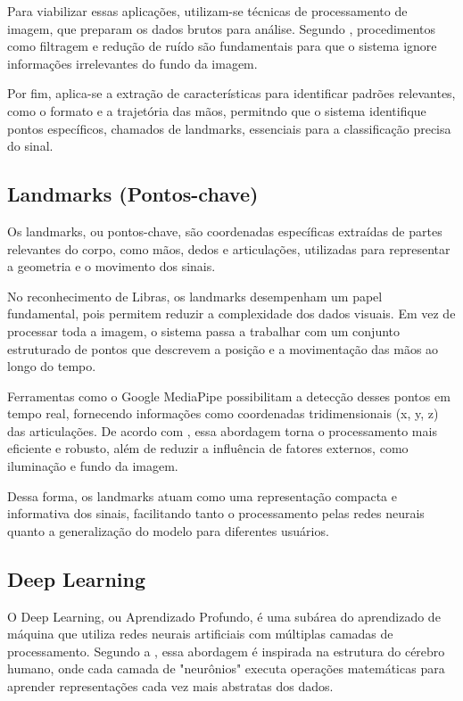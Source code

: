 \documentclass[
    12pt,                %
    openright,           %
    oneside,             %
    a4paper,             %
    english,             %
    brazil               %
]{abntex2}
\begin{document}
Para viabilizar essas aplicações, utilizam-se técnicas de processamento de imagem, que preparam os dados brutos para análise. Segundo , procedimentos como filtragem e redução de ruído são fundamentais para que o sistema ignore informações irrelevantes do fundo da imagem.

Por fim, aplica-se a extração de características para identificar padrões relevantes, como o formato e a trajetória das mãos, permitndo que o sistema identifique pontos específicos, chamados de landmarks, essenciais para a classificação precisa do sinal.


\subsection{Landmarks (Pontos-chave)}

Os landmarks, ou pontos-chave, são coordenadas específicas extraídas de partes relevantes do corpo, como mãos, dedos e articulações, utilizadas para representar a geometria e o movimento dos sinais.

No reconhecimento de Libras, os landmarks desempenham um papel fundamental, pois permitem reduzir a complexidade dos dados visuais. Em vez de processar toda a imagem, o sistema passa a trabalhar com um conjunto estruturado de pontos que descrevem a posição e a movimentação das mãos ao longo do tempo.

Ferramentas como o Google MediaPipe possibilitam a detecção desses pontos em tempo real, fornecendo informações como coordenadas tridimensionais (x, y, z) das articulações. De acordo com , essa abordagem torna o processamento mais eficiente e robusto, além de reduzir a influência de fatores externos, como iluminação e fundo da imagem.

Dessa forma, os landmarks atuam como uma representação compacta e informativa dos sinais, facilitando tanto o processamento pelas redes neurais quanto a generalização do modelo para diferentes usuários.

\subsection{Deep Learning}

O Deep Learning, ou Aprendizado Profundo, é uma subárea do aprendizado de máquina que utiliza redes neurais artificiais com múltiplas camadas de processamento. Segundo a , essa abordagem é inspirada na estrutura do cérebro humano, onde cada camada de "neurônios" executa operações matemáticas para aprender representações cada vez mais abstratas dos dados.
\end{document}
